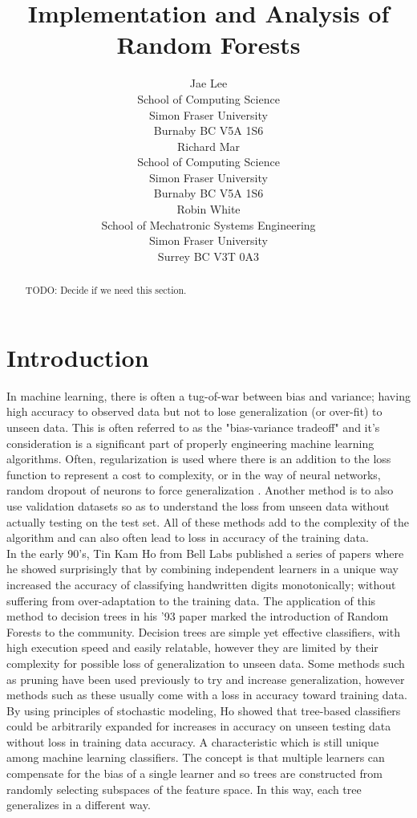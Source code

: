 \documentclass{article} %
\title{Implementation and Analysis of Random Forests}
\author{
Jae Lee\\
School of Computing Science\\
Simon Fraser University\\
Burnaby BC V5A 1S6 \\
\And
Richard Mar \\
School of Computing Science\\
Simon Fraser University\\
Burnaby BC V5A 1S6 \\
\AND
Robin White \\
School of Mechatronic Systems Engineering\\
Simon Fraser University\\
Surrey BC V3T 0A3 \\
}
\begin{document}
\maketitle

\begin{abstract}
TODO: Decide if we need this section.
\end{abstract}

\section{Introduction}


In machine learning, there is often a tug-of-war between bias and variance; having high accuracy to observed data but not to lose generalization (or over-fit) to unseen data. This is often referred to as the "bias-variance tradeoff" and it's consideration is a significant part of properly engineering machine learning algorithms. Often, regularization is used where there is an addition to the loss function to represent a cost to complexity, or in the way of neural networks, random dropout of neurons to force generalization \cite{Srivastava2014}. Another method is to also use validation datasets so as to understand the loss from unseen data without actually testing on the test set. All of these methods add to the complexity of the algorithm and can also often lead to loss in accuracy of the training data.\\
In the early 90's, Tin Kam Ho from Bell Labs published a series of papers where he showed surprisingly that by combining independent learners in a unique way increased the accuracy of classifying handwritten digits monotonically; without suffering from over-adaptation to the training data. \cite{Ho93, Ho95, Ho98} The application of this method to decision trees in his '93 paper marked the introduction of Random Forests to the community. \cite{Ho93} Decision trees are simple yet effective classifiers, with high execution speed and easily relatable, however they are limited by their complexity for possible loss of generalization to unseen data. Some methods such as pruning have been used previously to try and increase generalization, however methods such as these usually come with a loss in accuracy toward training data. By using principles of stochastic modeling, Ho showed that tree-based classifiers could be arbitrarily expanded for increases in accuracy on unseen testing data without loss in training data accuracy. A characteristic which is still unique among machine learning classifiers. The concept is that multiple learners can compensate for the bias of a single learner and so trees are constructed from randomly selecting subspaces of the feature space. In this way, each tree generalizes in a different way. \\
\end{document}
